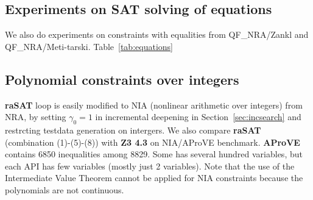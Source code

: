 \documentclass[runningheads,a4paper,oribibl]{llncs}
\begin{document}
\subsection{Experiments on SAT solving of equations}
We also do experiments on constraints with equalities from QF\_NRA/Zankl and QF\_NRA/Meti-tarski. Table~\ref{tab:equations} 
\begin{table}[t]
\centering
{}
\medskip 
\caption{Comparison among SMT solvers over equalities} \label{tab:equations}
\end{table}

\subsection{Polynomial constraints over integers} \label{sec:NIA}

{\bf raSAT} loop is easily modified to NIA (nonlinear arithmetic over integers) from NRA, 
by setting $\gamma_0 = 1$ in incremental deepening in Section~\ref{sec:incsearch} 
and restrcting testdata generation on intergers. 
We also compare {\bf raSAT} (combination (1)-(5)-(8)) with {\bf Z3 4.3} on NIA/AProVE benchmark. 
{\bf AProVE} contains 6850 inequalities among 8829. 
Some has several hundred variables, but each API has few variables (mostly just 2 variables). Note that the use of the Intermediate Value Theorem cannot be applied for NIA constraints because the polynomials are not continuous.
\end{document}
